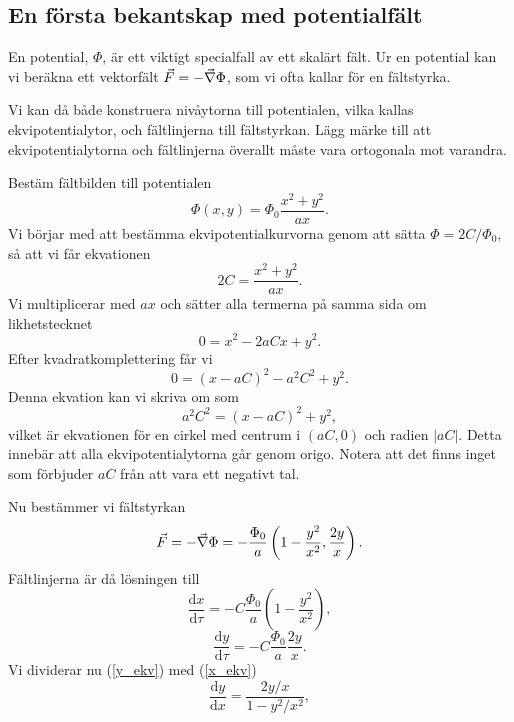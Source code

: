 \documentclass[%
oneside,                 %
final,                   %
10pt]{article}
\newenvironment{notice_mdfboxadmon}[1][]{
\begin{notice_mdfboxmdframed}[frametitle=#1]
}
{
\end{notice_mdfboxmdframed}
}
\begin{document}
\subsection*{En första bekantskap med potentialfält}

En potential, $\Phi$,  är ett viktigt specialfall av ett skalärt fält.  Ur en  potential kan vi beräkna ett vektorfält $\vec{F} = - \vec{\nabla} \Phi$, som vi ofta kallar för en fältstyrka.

Vi kan då både konstruera nivåytorna till potentialen, vilka kallas ekvipotentialytor, och fältlinjerna till fältstyrkan.  Lägg märke till att ekvipotentialytorna och fältlinjerna överallt måste vara ortogonala mot varandra.


\begin{notice_mdfboxadmon}
Bestäm fältbilden till potentialen
\begin{equation}
  \Phi\left(x,y\right) = \Phi_0 \frac{x^2 + y^2}{ax}.
\end{equation}
Vi börjar med att bestämma ekvipotentialkurvorna genom att sätta $\Phi = 2C/\Phi_0$, så att vi får ekvationen
\begin{equation}
  2C = \frac{x^2+y^2}{ax}.
\end{equation}
Vi multiplicerar med $ax$ och sätter alla termerna på samma sida om likhetstecknet
\begin{equation}
  0 = x^2 -2aCx +y^2.
\end{equation}
Efter kvadratkomplettering får vi
\begin{equation}
  0 = \left(x - aC\right)^2 -a^2 C^2 + y^2.
\end{equation}
Denna ekvation kan vi skriva om som
\begin{equation}
  a^2 C^2 = \left(x - aC\right)^2 + y^2,
\end{equation}
vilket är ekvationen för en cirkel med centrum i $(aC,0)$ och radien $|aC|$.  Detta innebär att alla ekvipotentialytorna går genom origo. Notera att det finns inget som förbjuder $aC$ från att vara ett negativt tal.

Nu bestämmer vi fältstyrkan
\begin{equation}
  \vec{F} = - \vec{\nabla} \Phi = - \frac{\Phi_0}{a} \left(1 - \frac{y^2}{x^2},
\frac{2y}{x}\right).
\end{equation}
Fältlinjerna är då lösningen till 
\begin{equation}
  \frac{\mbox{d}x}{\mbox{d}\tau} = -C \frac{\Phi_0}{a}\left(1 - \frac{y^2}{x^2}
\right),
\label{x_ekv}
\end{equation}
\begin{equation}
  \frac{\mbox{d}y}{\mbox{d}\tau} = -C \frac{\Phi_0}{a} \frac{2y}{x}.
\label{y_ekv}
\end{equation}
Vi dividerar nu (\ref{y_ekv}) med (\ref{x_ekv})
\begin{equation}
\label{diffekv}
  \frac{\mbox{d}y}{\mbox{d}x} = \frac{2y/x}{1-y^2/x^2},
\end{equation}


\end{notice_mdfboxadmon}
\end{document}
